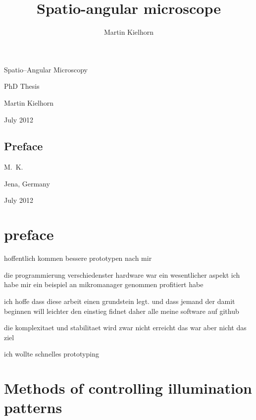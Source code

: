 \documentclass[oneside,a4paper,12pt,BCOR20mm,DIV14]{scrbook} %
\title{Spatio-angular microscope} %
\author{Martin Kielhorn}
\def\svgending{\ifx\pdfoutput\undefined%
  .eps_tex%
  \else%
  .pdf_tex%
  \fi}
\newcommand{\svginput}[2]{{\def\svgscale{#1}}}
\begin{document}
\listoftodos
\begin{titlepage}
  
  \hspace{-4cm}
  \svginput{1}{objective-trace}



  \vspace{-5cm}
  
  \hspace{4cm}\textsf{\Huge Spatio--Angular Microscopy}
  
  \vspace{2cm}
  \hspace{6cm}\textsf{\huge PhD Thesis}


  \vspace{3cm}
  \hspace{4cm}\textsf{\Large Martin Kielhorn}
  
  \vspace{1cm}
  \hspace{4cm}\textsf{\Large July 2012}
\end{titlepage}
\newpage

\section*{Preface}
\begin{flushright}
  M.~K.
\end{flushright}

\noindent
Jena, Germany

\noindent
July 2012

\newpage
\tableofcontents
\printnomenclature
\chapter*{preface}
hoffentlich kommen bessere prototypen nach mir

die programmierung verschiedenster hardware war ein wesentlicher aspekt
ich habe mir ein beispiel an mikromanager genommen profitiert habe

ich hoffe dass diese arbeit einen grundstein legt.
und dass jemand der damit beginnen will leichter den einstieg fidnet
daher alle meine software auf github

die komplexitaet und stabilitaet wird zwar nicht erreicht
das war aber nicht das ziel

ich wollte schnelles prototyping



\chapter{Methods of controlling illumination patterns}
\label{sec:illum-patterns}


\end{document}
